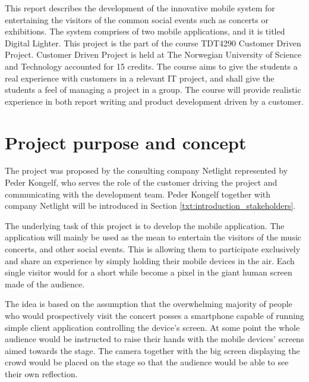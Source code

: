 This report describes the development of the innovative mobile system for entertaining the visitors of the common social events such as concerts or exhibitions. The system comprises of two mobile applications, and it is titled Digital Lighter. This project is the part of the course TDT4290 Customer Driven Project. 
Customer Driven Project is held at The Norwegian University of Science and Technology accounted for 15 credits. The course aims to give the students a real experience with customers in a relevant IT project, and shall give the students a feel of managing a project in a group. The course will provide realistic experience in both report writing and product development driven by a customer. 


\section{Project purpose and concept}
The project was proposed by the consulting company Netlight represented by Peder Kongelf, who serves the role of the customer driving the project and communicating with the development team. Peder Kongelf together with company Netlight will be introduced in Section \ref{txt:introduction_stakeholders}.

The underlying task of this project is to develop the mobile application. The application will mainly be used as the mean to entertain the visitors of the music concerts, and other social events. This is allowing them to participate exclusively and share an experience by simply holding their mobile devices in the air. Each single visitor would for a short while become a pixel in the giant human screen made of the audience. 

The idea is based on the assumption that the overwhelming majority of people who would prospectively visit the concert posses a smartphone capable of running simple client application controlling the device's screen. At some point the whole audience would be instructed to raise their hands with the mobile devices' screens aimed towards the stage. The camera together with the big screen displaying the crowd would be placed on the stage so that the audience would be able to see their own reflection.

